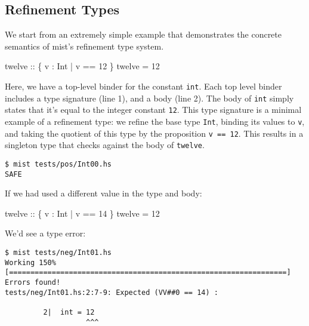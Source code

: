 \documentclass[
]{darts-v2021}
\newenvironment{Shaded}{}{}
\newcommand{\DataTypeTok}[1]{\textcolor[rgb]{0.56,0.13,0.00}{#1}}
\newcommand{\DecValTok}[1]{\textcolor[rgb]{0.25,0.63,0.44}{#1}}
\newcommand{\NormalTok}[1]{#1}
\newcommand{\OperatorTok}[1]{\textcolor[rgb]{0.40,0.40,0.40}{#1}}
\newcommand{\OtherTok}[1]{\textcolor[rgb]{0.00,0.44,0.13}{#1}}
\begin{document}
\hypertarget{refinement-types}{%
\subsection{Refinement Types}\label{refinement-types}}

We start from an extremely simple example that demonstrates the concrete
semantics of mist's refinement type system.

\begin{Shaded}
\begin{Highlighting}[numbers=left,,]
\OtherTok{twelve ::}\NormalTok{ \{ v }\OperatorTok{:} \DataTypeTok{Int}  \OperatorTok{|}\NormalTok{ v }\OperatorTok{==} \DecValTok{12}\NormalTok{ \}}
\NormalTok{twelve }\OtherTok{=} \DecValTok{12}
\end{Highlighting}
\end{Shaded}

Here, we have a top-level binder for the constant \texttt{int}. Each top
level binder includes a type signature (line 1), and a body (line 2).
The body of \texttt{int} simply states that it's equal to the integer
constant \texttt{12}. This type signature is a minimal example of a
refinement type: we refine the base type \texttt{Int}, binding its
values to \texttt{v}, and taking the quotient of this type by the
proposition \texttt{v\ ==\ 12}. This results in a singleton type that
checks against the body of \texttt{twelve}.

\begin{verbatim}
$ mist tests/pos/Int00.hs
SAFE
\end{verbatim}

If we had used a different value in the type and body:

\begin{Shaded}
\begin{Highlighting}[numbers=left,,]
\OtherTok{twelve ::}\NormalTok{ \{ v }\OperatorTok{:} \DataTypeTok{Int}  \OperatorTok{|}\NormalTok{ v }\OperatorTok{==} \DecValTok{14}\NormalTok{ \}}
\NormalTok{twelve }\OtherTok{=} \DecValTok{12}
\end{Highlighting}
\end{Shaded}

We'd see a type error:

\begin{verbatim}
$ mist tests/neg/Int01.hs
Working 150% [=================================================================]
Errors found!
tests/neg/Int01.hs:2:7-9: Expected (VV##0 == 14) :

         2|  int = 12
                   ^^^
\end{verbatim}
\end{document}
